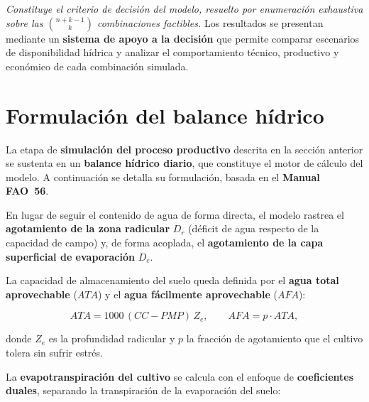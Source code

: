 \documentclass[12pt]{report}
\begin{document}
\textit{Constituye el criterio de decisión del modelo, resuelto por enumeración exhaustiva sobre las $\binom{n+k-1}{k}$ combinaciones factibles.} Los resultados se presentan mediante un \textbf{sistema de apoyo a la decisión} que permite comparar escenarios de disponibilidad hídrica y analizar el comportamiento técnico, productivo y económico de cada combinación simulada.

\section{Formulación del balance hídrico}

La etapa de \textbf{simulación del proceso productivo} descrita en la sección anterior se sustenta en un \textbf{balance hídrico diario}, que constituye el motor de cálculo del modelo. A continuación se detalla su formulación, basada en el \textbf{Manual FAO~56}.

\vspace{0.2cm}

En lugar de seguir el contenido de agua de forma directa, el modelo rastrea el \textbf{agotamiento de la zona radicular} $D_r$ (déficit de agua respecto de la capacidad de campo) y, de forma acoplada, el \textbf{agotamiento de la capa superficial de evaporación} $D_e$.

\vspace{0.2cm}

La capacidad de almacenamiento del suelo queda definida por el \textbf{agua total aprovechable} ($ATA$) y el \textbf{agua fácilmente aprovechable} ($AFA$):

\vspace{0.2cm}

\begin{equation}
ATA = 1000\,(CC - PMP)\,Z_e,
\qquad
AFA = p\cdot ATA,
\end{equation}

\vspace{0.2cm}

donde $Z_e$ es la profundidad radicular y $p$ la fracción de agotamiento que el cultivo tolera sin sufrir estrés.

\vspace{0.2cm}

La \textbf{evapotranspiración del cultivo} se calcula con el enfoque de \textbf{coeficientes duales}, separando la transpiración de la evaporación del suelo:

\vspace{0.2cm}
\end{document}
